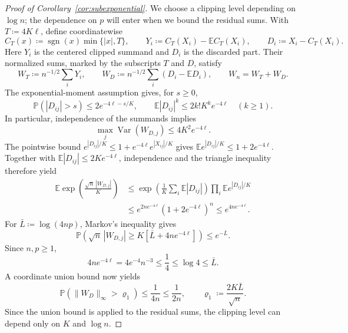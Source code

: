 \documentclass[11pt,letterpaper]{article}
\theoremstyle{remark}
\newcommand{\E}{\mathbb E}
\newcommand{\Pp}{\mathbb P}
\newcommand{\Var}{\operatorname{Var}}
\begin{document}
\begin{proof}[Proof of Corollary~\ref{cor:subexponential}]
We choose a clipping level depending on \(\log n\); the dependence
on \(p\) will enter when we bound the residual sums. With \(T\coloneqq4K\ell\), define coordinatewise
\[
 C_T(x)\coloneqq \operatorname{sgn}(x)\min\{|x|,T\},\qquad
 Y_i\coloneqq C_T(X_i)-\E C_T(X_i),\qquad D_i\coloneqq X_i-C_T(X_i).
\]
Here \(Y_i\) is the centered clipped summand and \(D_i\) is the discarded
part. Their normalized sums, marked by the subscripts \(T\) and \(D\), satisfy
\[
 W_T\coloneqq n^{-1/2}\sum_iY_i,\qquad
 W_D\coloneqq n^{-1/2}\sum_i(D_i-\E D_i),\qquad W_n=W_T+W_D.
\]
The exponential-moment assumption gives, for \(s\ge0\),
\[
 \Pp(|D_{ij}|>s)\le2e^{-4\ell-s/K},\qquad
 \E|D_{ij}|^k\le2k!K^ke^{-4\ell}\quad(k\ge1).
\]
In particular, independence of the summands implies
\begin{equation}
 \max_j\Var(W_{D,j})\le4K^2e^{-4\ell}.
 \label{tail:residual-moments}
\end{equation}
The pointwise bound \(e^{|D_{ij}|/K}\le1+e^{-4\ell}e^{|X_{ij}|/K}\)
gives \(\E e^{|D_{ij}|/K}\le1+2e^{-4\ell}\). Together with
\(\E|D_{ij}|\le2Ke^{-4\ell}\), independence and the triangle inequality
therefore yield
\begin{align*}
 \E\exp\!\left(\frac{\sqrt n\,|W_{D,j}|}{K}\right)
 &\le\exp\!\left(\frac1K\sum_i\E|D_{ij}|\right)
          \prod_i\E e^{|D_{ij}|/K}\\
 &\le e^{2ne^{-4\ell}}(1+2e^{-4\ell})^n
 \le e^{4ne^{-4\ell}}.
\end{align*}
For \(\bar L\coloneqq \log(4np)\), Markov's inequality gives
\[
 \Pp\!\left(\sqrt n\,|W_{D,j}|\ge K[\bar L+4ne^{-4\ell}]\right)\le e^{-\bar L}.
\]
Since \(n,p\ge1\),
\[
 4ne^{-4\ell}=4e^{-4}n^{-3}\le\frac14\le\log4\le \bar L.
\]
A coordinate union bound now yields
\begin{equation}
 \Pp(\|W_D\|_\infty>\varrho_1)\le\frac1{4n}\le\frac1{2n},\qquad
 \varrho_1\coloneqq \frac{2K\bar L}{\sqrt n}.
 \label{tail:sum-coupling}
\end{equation}
Since the union bound is applied to the residual sums, the clipping
level can depend only on \(K\) and \(\log n\).


\end{proof}
\end{document}
